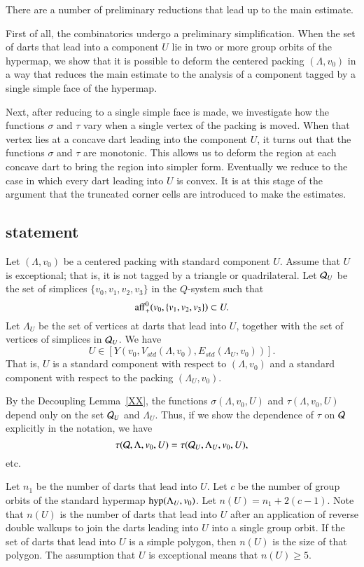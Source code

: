 There are a number of preliminary reductions that lead up to the
main estimate. 

First of all, the combinatorics undergo a preliminary simplification.
When the set of darts that lead into a component $U$ lie in
two or more group orbits of the hypermap, we show that it is possible
to deform the centered packing $(\Lambda,v_0)$ in a way that
reduces the main estimate to the analysis of a component tagged
by a single simple face of the hypermap.

Next, after reducing to a single simple face is made, we investigate
how the functions $\sigma$ and $\tau$ vary when a single vertex
of the packing is moved.  When that vertex lies at a concave dart
leading into the component $U$, it turns out that the functions $\sigma$ and
$\tau$ are monotonic. This allows us to deform the region at each
concave dart to bring the region into simpler form.  Eventually 
we reduce to the case in which every dart leading into $U$ 
is convex.  It is at this stage of the argument that the truncated
corner cells are introduced to make the estimates.

\subsection{statement}

Let $(\Lambda,v_0)$ be a centered packing with standard component
$U$.  Assume that $U$ is exceptional; that is, it is not tagged
by a triangle or quadrilateral.  Let ${\mathcal Q}_U$ be the set of
simplices $\{v_0,v_1,v_2,v_3\}$ in the $Q$-system such that
$$
{\operatorname{aff}}_+^0(v_0,\{v_1,v_2,v_3\})\subset U.
$$
Let $\Lambda_U$ be the set of vertices at darts that lead into $U$,
together with the set of vertices of simplices in ${\mathcal Q}_U$.
We have 
   $$U\in[Y(v_0,V_{std}(\Lambda,v_0),E_{std}(\Lambda_U,v_0))].$$
That is, $U$ is a standard component with respect to $(\Lambda,v_0)$
and a standard component with respect to the packing $(\Lambda_U,v_0)$.

By the Decoupling Lemma~\ref{XX}, the functions $\sigma(\Lambda,v_0,U)$
and $\tau(\Lambda,v_0,U)$ depend only on the set ${\mathcal Q}_U$ 
and $\Lambda_U$.  Thus, if we show the dependence of $\tau$
on ${\mathcal Q}$ explicitly in the notation, we have
  $$\tau({\mathcal Q},\Lambda,v_0,U) = \tau({\mathcal Q}_U,\Lambda_U,v_0,U),$$
etc.  

Let $n_1$ be the number of darts that lead into $U$.  Let $c$ be
the number of group orbits of the standard hypermap ${\operatorname{hyp}}(\Lambda_U,v_0)$.
Let $n(U) = n_1 + 2 (c-1)$.   Note that $n(U)$ is the number of darts
that lead into $U$ after an application of reverse double
walkups to join the darts leading into $U$ into a single group orbit.
If the set of darts that lead into $U$ is a simple polygon, then
$n(U)$ is the size of that polygon.  The assumption that $U$ is
exceptional means that $n(U)\ge 5$.

